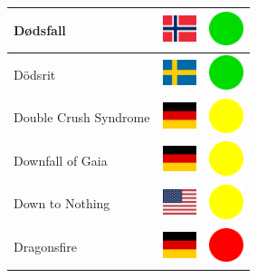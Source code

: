 \documentclass[12pt, a4paper, twoside]{report}
\begin{document}
\begin{center}
\begin{longtable}{|p{5cm}|p{2cm}|p{2cm}|}
 Dødsfall                                                   & \includegraphics[width=1cm]{../img/flags/no} &   \includegraphics[width=1cm]{../likes/y} \\ \hline
 Dödsrit                                                    & \includegraphics[width=1cm]{../img/flags/se} &   \includegraphics[width=1cm]{../likes/y} \\ \hline
 Double Crush Syndrome                                      & \includegraphics[width=1cm]{../img/flags/de} &   \includegraphics[width=1cm]{../likes/m} \\ \hline
 Downfall of Gaia                                           & \includegraphics[width=1cm]{../img/flags/de} &   \includegraphics[width=1cm]{../likes/m} \\ \hline
 Down to Nothing                                            & \includegraphics[width=1cm]{../img/flags/us} &   \includegraphics[width=1cm]{../likes/m} \\ \hline
 Dragonsfire                                                & \includegraphics[width=1cm]{../img/flags/de} &   \includegraphics[width=1cm]{../likes/n} \\ \hline

\end{longtable}
\end{center}
\end{document}

